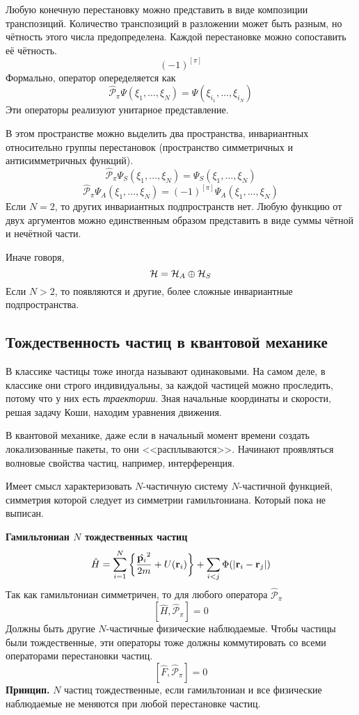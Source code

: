Любую конечную перестановку можно представить в виде композиции транспозиций. Количество транспозиций в разложении может быть разным, но чётность этого числа предопределена. Каждой перестановке можно сопоставить её чётность.
$$
    (-1)^{[\pi]}
$$ 
Формально, оператор опеределяется как
$$
    \hat{\mathcal P}_{\pi} \Psi(\xi_1, \ldots, \xi_N) = \Psi(\xi_{i_1}, \ldots, \xi_{i_N})
$$
Эти операторы реализуют унитарное представление.

В этом пространстве можно выделить два пространства, инвариантных относительно группы перестановок (пространство симметричных и антисимметричных функций).
\def \mP{\hat{\mathcal P}}
$$
    \mP_{\pi} \Psi_S (\xi_1, \ldots, \xi_N) = \Psi_S (\xi_1, \ldots, \xi_N)
$$
$$
    \mP_{\pi} \Psi_A (\xi_1, \ldots, \xi_N) = (-1)^{[\pi]} \Psi_A (\xi_1, \ldots, \xi_N)
$$
Если $N = 2$, то других инвариантных подпространств нет. Любую функцию от двух аргументов можно единственным образом представить в виде суммы чётной и нечётной части.

Иначе говоря,
$$
    \H = \H_A \oplus \H_S
$$ 
Если $N > 2$, то появляются и другие, более сложные инвариантные подпространства.

\subsection{Тождественность частиц в квантовой механике}
В классике частицы тоже иногда называют одинаковыми. На самом деле, в классике они строго индивидуальны, за каждой частицей можно проследить, потому что у них есть \emph{траектории}.  Зная начальные координаты и скорости, решая задачу Коши, находим уравнения движения.

В квантовой механике, даже если в начальный момент времени создать локализованные пакеты, то они <<расплываются>>. Начинают проявляться волновые свойства частиц, например, интерференция.

Имеет смысл характеризовать $N$-частичную систему $N$-частичной функцией, симметрия которой следует из симметрии гамильтониана. Который пока не выписан.

\textbf{Гамильтониан $N$ тождественных частиц}
$$
    \hat H = \sum_{i=1}^{N} \left\{
        \dfrac{\hat{\bf p_i}^2}{2m} + U(\bf r_i)
\right\} + \sum_{i<j} \Phi(|\bf r_i - \bf r_j|)
$$
Так как гамильтониан симметричен, то для любого оператора $\mP_{\pi}$
$$
    [\hat H, \mP_\pi] = 0
$$
Должны быть другие $N$-частичные физические наблюдаемые. Чтобы частицы были тождественные, эти операторы тоже должны коммутировать со всеми операторами перестановки частиц.
$$
    [\hat F, \mP_\pi] = 0
$$
\textbf{Принцип.} $N$ частиц тождественные, если гамильтониан и все физические наблюдаемые не меняются при любой перестановке частиц. 


